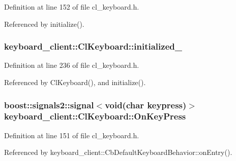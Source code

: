 Definition at line 152 of file cl\+\_\+keyboard.\+h.



Referenced by initialize().

\subsubsection[{\texorpdfstring{initialized\+\_\+}{initialized_}}]{ keyboard\+\_\+client\+::\+Cl\+Keyboard\+::initialized\+\_\+\hspace{0.3cm}{\ttfamily [private]}}\hypertarget{classkeyboard__client_1_1ClKeyboard_aff74d4f212f4846a1f7cc6c0e4d5f728}{}\label{classkeyboard__client_1_1ClKeyboard_aff74d4f212f4846a1f7cc6c0e4d5f728}


Definition at line 236 of file cl\+\_\+keyboard.\+h.



Referenced by Cl\+Keyboard(), and initialize().

\subsubsection[{\texorpdfstring{On\+Key\+Press}{OnKeyPress}}]{\setlength{\rightskip}{0pt plus 5cm}boost\+::signals2\+::signal$<$void(char keypress)$>$ keyboard\+\_\+client\+::\+Cl\+Keyboard\+::\+On\+Key\+Press}\hypertarget{classkeyboard__client_1_1ClKeyboard_a771589b55252145020691bfb6ec47adf}{}\label{classkeyboard__client_1_1ClKeyboard_a771589b55252145020691bfb6ec47adf}


Definition at line 151 of file cl\+\_\+keyboard.\+h.



Referenced by keyboard\+\_\+client\+::\+Cb\+Default\+Keyboard\+Behavior\+::on\+Entry().

